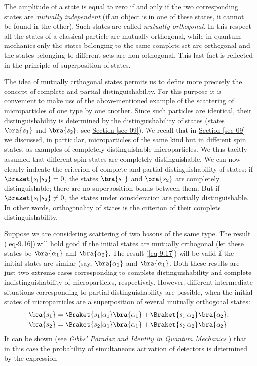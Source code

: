 \documentclass[a4paper,sfsidenotes,colorlinks=true]{tufte-book}
\numberwithin{equation}{section}
\numberwithin{figure}{section}
\begin{document}
The amplitude of a state is equal to zero if and only if the two
corresponding states are \emph{mutually independent} (if an object is
in one of these states, it cannot be found in the other). Such states
are called \emph{mutually orthogonal}. In this respect all the states
of a classical particle are mutually orthogonal, while in quantum
mechanics only the states belonging to the same complete set are
orthogonal and the states belonging to different sets are
non-orthogonal. This last fact is reflected in the principle of
superposition of states.

The idea of mutually orthogonal states permits us to define more
precisely the concept of complete and partial distinguishability. For
this purpose it is convenient to make use of the above-mentioned
example of the scattering of microparticles of one type by one
another. Since such particles are identical, their distinguishability
is determined by the distinguishability of states (states
$\bra{s_{1}}$ and $\bra{s_{2}}$; see \hyperref[sec-09]{Section
  \ref{sec-09}}). We recall that in \hyperref[sec-09]{Section
  \ref{sec-09}} we discussed, in particular, microparticles of the
same kind but in different spin states, as examples of completely
distinguishable microparticles. We thus tacitly assumed that different
spin states are completely distinguishable. We can now clearly
indicate the criterion of complete and partial distinguishability of
states: if $\Braket{s_{1}| s_{2}} =0$, the states $\bra{s_{1}}$ and
$\bra{s_{2}}$ are completely distinguishable; there are no
superposition bonds between them. But if $\Braket{s_{1}| s_{2}} \ne
0$, the states under consideration are partially distinguishable. In
other words, orthogonality of states is the criterion of their
complete distinguishability.

Suppose we are considering scattering of two bosons of the same
type. The result (\ref{eq-9.16}) will hold good if the initial states
are mutually orthogonal (let these states be $\bra{\alpha_{1}}$ and
$\bra{\alpha_{2}}$. The result (\ref{eq-9.17}) will be valid if the
  initial states are similar (say, $\bra{\alpha_{1}}$ and
  $\bra{\alpha_{1}}$. Both these results are just two extreme cases
  corresponding to complete distinguishability and complete
  indistinguishability of microparticles, respectively. However,
  different intermediate situations corresponding to partial
  distinguishability are possible, when the initial states of
  microparticles are a superposition of several mutually orthogonal
  states:
\begin{equation}
\begin{split}
\bra{s_{1}} & = \Braket{s_{1} | \alpha_{1}}\bra{\alpha_{1}} +
\Braket{s_{1} | \alpha_{2}}\bra{\alpha_{2}}, \\
\bra{s_{2}} & = \Braket{s_{2} | \alpha_{1}}\bra{\alpha_{1}} +
\Braket{s_{2} | \alpha_{2}}\bra{\alpha_{2}}
\end{split}
\label{eq-10.6}
\end{equation}
It can be shown (see \emph{Gibbs' Paradox and Identity in Quantum Mechanics}
\cite{helfer-1975}) that in this case the probability of simultaneous
activation of detectors is determined by the expression
\end{document}
